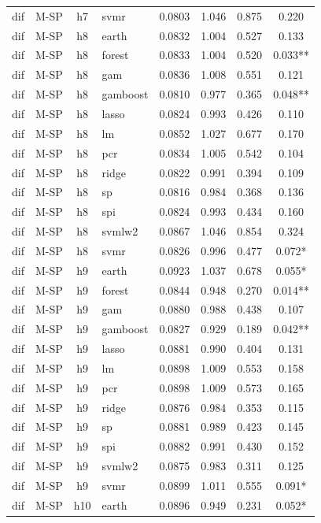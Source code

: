 \begin{ThreePartTable}
\begin{longtable}[t]{llclcccc}
dif & M-SP & h7 & svmr & 0.0803 & 1.046 & 0.875 & 0.220\\
\addlinespace
dif & M-SP & h8 & earth & 0.0832 & 1.004 & 0.527 & 0.133\\
dif & M-SP & h8 & forest & 0.0833 & 1.004 & 0.520 & 0.033**\\
dif & M-SP & h8 & gam & 0.0836 & 1.008 & 0.551 & 0.121\\
dif & M-SP & h8 & gamboost & 0.0810 & 0.977 & 0.365 & 0.048**\\
dif & M-SP & h8 & lasso & 0.0824 & 0.993 & 0.426 & 0.110\\
dif & M-SP & h8 & lm & 0.0852 & 1.027 & 0.677 & 0.170\\
dif & M-SP & h8 & pcr & 0.0834 & 1.005 & 0.542 & 0.104\\
dif & M-SP & h8 & ridge & 0.0822 & 0.991 & 0.394 & 0.109\\
dif & M-SP & h8 & sp & 0.0816 & 0.984 & 0.368 & 0.136\\
dif & M-SP & h8 & spi & 0.0824 & 0.993 & 0.434 & 0.160\\
dif & M-SP & h8 & svmlw2 & 0.0867 & 1.046 & 0.854 & 0.324\\
dif & M-SP & h8 & svmr & 0.0826 & 0.996 & 0.477 & 0.072*\\
\addlinespace
dif & M-SP & h9 & earth & 0.0923 & 1.037 & 0.678 & 0.055*\\
dif & M-SP & h9 & forest & 0.0844 & 0.948 & 0.270 & 0.014**\\
dif & M-SP & h9 & gam & 0.0880 & 0.988 & 0.438 & 0.107\\
dif & M-SP & h9 & gamboost & 0.0827 & 0.929 & 0.189 & 0.042**\\
dif & M-SP & h9 & lasso & 0.0881 & 0.990 & 0.404 & 0.131\\
dif & M-SP & h9 & lm & 0.0898 & 1.009 & 0.553 & 0.158\\
dif & M-SP & h9 & pcr & 0.0898 & 1.009 & 0.573 & 0.165\\
dif & M-SP & h9 & ridge & 0.0876 & 0.984 & 0.353 & 0.115\\
dif & M-SP & h9 & sp & 0.0881 & 0.989 & 0.423 & 0.145\\
dif & M-SP & h9 & spi & 0.0882 & 0.991 & 0.430 & 0.152\\
dif & M-SP & h9 & svmlw2 & 0.0875 & 0.983 & 0.311 & 0.125\\
dif & M-SP & h9 & svmr & 0.0899 & 1.011 & 0.555 & 0.091*\\
\addlinespace
dif & M-SP & h10 & earth & 0.0896 & 0.949 & 0.231 & 0.052*\\

\end{longtable}
\end{ThreePartTable}
